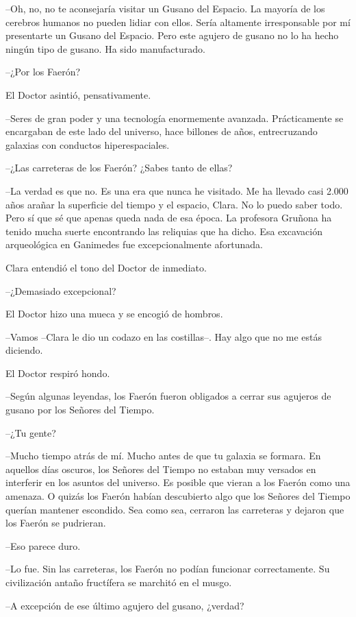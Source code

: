 {--Oh, no, no te aconsejaría visitar un Gusano del Espacio. La mayoría de
 los cerebros humanos no pueden lidiar con ellos. Sería altamente
 irresponsable por mí presentarte un Gusano del Espacio. Pero este
 agujero de gusano no lo ha hecho ningún tipo de gusano. Ha sido
manufacturado.}

{--¿Por los Faerón?}

{El Doctor asintió, pensativamente.}

{--Seres de gran poder y una tecnología enormemente avanzada.
 Prácticamente se encargaban de este lado del universo, hace billones de
años, entrecruzando galaxias con conductos hiperespaciales.}

{--¿Las carreteras de los Faerón? ¿Sabes tanto de ellas?}

{--La verdad es que no. Es una era que nunca he visitado. Me ha llevado
 casi 2.000 años arañar la superficie del tiempo y el espacio, Clara. No
 lo puedo saber todo. Pero sí que sé que apenas queda nada de esa época.
 La profesora Gruñona ha tenido mucha suerte encontrando las reliquias
 que ha dicho. Esa excavación arqueológica en Ganimedes fue
excepcionalmente afortunada.}

{Clara entendió el tono del Doctor de inmediato.}

{--¿Demasiado excepcional?}

{El Doctor hizo una mueca y se encogió de hombros.}

{--Vamos --Clara le dio un codazo en las costillas--. Hay algo que no me
estás diciendo.}

{El Doctor respiró hondo.}

{--Según algunas leyendas, los Faerón fueron obligados a cerrar sus
agujeros de gusano por los Señores del Tiempo.}

{--¿Tu gente?}

{--Mucho tiempo atrás de mí. Mucho antes de que tu galaxia se formara. En
 aquellos días oscuros, los Señores del Tiempo no estaban muy versados en
 interferir en los asuntos del universo. Es posible que vieran a los
 Faerón como una amenaza. O quizás los Faerón habían descubierto algo que
 los Señores del Tiempo querían mantener escondido. Sea como sea,
cerraron las carreteras y dejaron que los Faerón se pudrieran.}

{--Eso parece duro.}

{--Lo fue. Sin las carreteras, los Faerón no podían funcionar
 correctamente. Su civilización antaño fructífera se marchitó en el
musgo.}

{--A excepción de ese último agujero del gusano, ¿verdad?}

